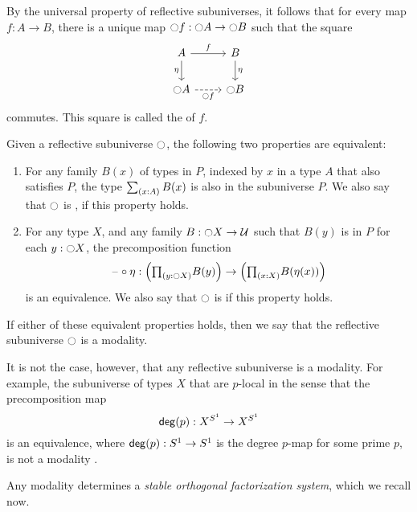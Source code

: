 \documentclass[9pt,twosided]{amsart}
\begin{document}
By the universal property of reflective subuniverses, it follows that for every map $f:A\to B$, there is a unique map ${\ocircle} f : {\ocircle} A \to {\ensuremath{\ocircle}} B$ such that the square
\begin{equation*}
  \begin{tikzcd}
    A \arrow[d,swap,"\eta"] \arrow[r,"f"] & B \arrow[d,"\eta"] \\
    \modal A \arrow[r,dashed,swap,"\modal f"] & \modal B
  \end{tikzcd}
\end{equation*}
commutes. This square is called the  of $f$.

\begin{prp}\label{prp:modality}
  Given a reflective subuniverse ${\ocircle}$, the following two properties are equivalent:
  \begin{enumerate}
  \item For any family $B(x)$ of types in $P$, indexed by $x$ in a type $A$ that also satisfies $P$, the type $\sm{x:A}B(x)$ is also in the subuniverse $P$. We also say that ${\ocircle}$ is , if this property holds.
  \item For any type $X$, and any family $B:{\ocircle} X\to\mathcal{U}$ such that $B(y)$ is in $P$ for each $y:{\ocircle} X$, the precomposition function
    \begin{equation*}
      \blank\circ\eta : \Big(\prd{y:\modal X}B(y)\Big)\to\Big(\prd{x:X}B(\eta(x))\Big)
    \end{equation*}
    is an equivalence. We also say that ${\ocircle}$ is  if this property holds.
  \end{enumerate}
  If either of these equivalent properties holds, then we say that the reflective subuniverse ${\ocircle}$ is a modality.
\end{prp}

It is not the case, however, that any reflective subuniverse is a modality. For example, the subuniverse of types $X$ that are $p$-local in the sense that the precomposition map
\begin{equation*}
  \mathsf{deg}(p) : X^{S^{1}}\to X^{S^{1}}
\end{equation*}
is an equivalence, where $\mathsf{deg}(p):S^{1}\to S^{1}$ is the degree $p$-map for some prime $p$, is not a modality \cite{CORS}.

Any modality determines a \emph{stable orthogonal factorization system}, which we recall now.
\end{document}

